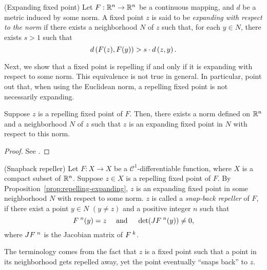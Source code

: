 \documentclass[10pt,draft,twoside]{book}
\begin{document}
\begin{definition}
  (Expanding fixed point)
  Let $F: \mathbb{R}^n \to \mathbb{R}^n$ be a continuous mapping, and $d$ be a metric induced by some norm.
  A fixed point $z$ is said to be \textit{expanding with respect to the norm} if there exists a neighborhood $N$ of $z$ such that, for each $y \in N$, there exists $s > 1$ such that 
  \begin{equation*}
    d\left( F(z), F(y) \right) > s \cdot d\left( z,y \right).
  \end{equation*}
\end{definition}
Next, we show that a fixed point is repelling if and only if it is expanding with respect to some norm.
This equivalence is not true in general.
In particular, \citet{shi} point out that, when using the Euclidean norm, a repelling fixed point is not necessarily expanding.

\begin{proposition}
  Suppose $z$ is a repelling fixed point of $F$.
  Then, there exists a norm defined on $\mathbb{R}^n$ and a neighborhood $N$ of $z$ such that $z$ is an expanding fixed point in $N$ with respect to this norm.
  \begin{proof}
    See \citet[p. 278-281]{hirsch}.
  \end{proof}
  \label{prop:repelling-expanding}
\end{proposition}

\begin{definition}
  (Snapback repeller)
  Let $F: X\to X$ be a $\mathcal{C}^1$-differentiable function, where $X$ is a compact subset of $\mathbb{R}^n$.
  Suppose $z \in X$ is a repelling fixed point of $F$.
  By Proposition~\ref{prop:repelling-expanding}, $z$ is an expanding fixed point in some neighborhood $N$ with respect to some norm.
  $z$ is called a \textit{snap-back repeller} of $F$, if there exist a point $y \in N$ $(y \neq z)$ and a positive integer $n$ such that 
  \begin{equation*}
   F^{\;n}(y) = z \quad\mbox{ and }\quad \det(JF^{\;n}(y)) \neq 0,
  \end{equation*}
  where $JF^{\;n}$ is the Jacobian matrix of $F^{\;k}$.
\end{definition}
The terminology comes from the fact that $z$ is a fixed point such that a point in its neighborhood gets repelled away, yet the point eventually ``snaps back'' to $z$.
\end{document}
